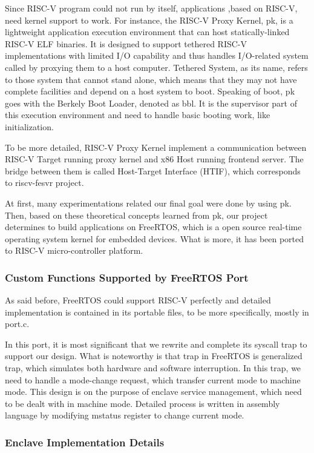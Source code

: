 \documentclass[conference]{IEEEtran}
\begin{document}
Since RISC-V program could not run by itself, applications ,based on RISC-V, need kernel support to work.  For instance, the RISC-V Proxy Kernel, pk, is a lightweight application execution environment that can host statically-linked RISC-V ELF binaries. It is designed to support tethered RISC-V implementations with limited I/O capability and thus handles I/O-related system called by proxying them to a host computer. Tethered System, as its name, refers to those system that cannot stand alone, which means that they may not have complete facilities and depend on a host system to boot. Speaking of boot, pk goes with the Berkely Boot Loader, denoted as bbl. It is the supervisor part of this execution environment and need to handle basic booting work, like initialization.

To be more detailed, RISC-V Proxy Kernel implement a communication between RISC-V Target running proxy kernel and x86 Host running frontend server. The bridge between them is called Host-Target Interface (HTIF), which corresponds to riscv-fesvr project.

At first, many experimentations related our final goal were done by using pk. Then, based on these theoretical concepts learned from pk, our project determines to build applications on FreeRTOS, which is a open source real-time operating system kernel for embedded devices. What is more, it has been ported to RISC-V micro-controller platform. 

\subsubsection{Custom Functions Supported by FreeRTOS Port}

As said before, FreeRTOS could support RISC-V perfectly and detailed implementation is contained in its portable files, to be more specifically, mostly in port.c.  

In this port, it is most significant that we rewrite and complete its syscall trap to support our design. What is noteworthy is that trap in FreeRTOS is generalized trap, which simulates both hardware and software interruption. In this trap, we need to handle a mode-change request, which transfer current mode to machine mode. This design is on the purpose of enclave service management, which need to be dealt with in machine mode. Detailed process is written in assembly language by modifying mstatus register to change current mode.

\subsubsection{Enclave Implementation Details}
\end{document}
